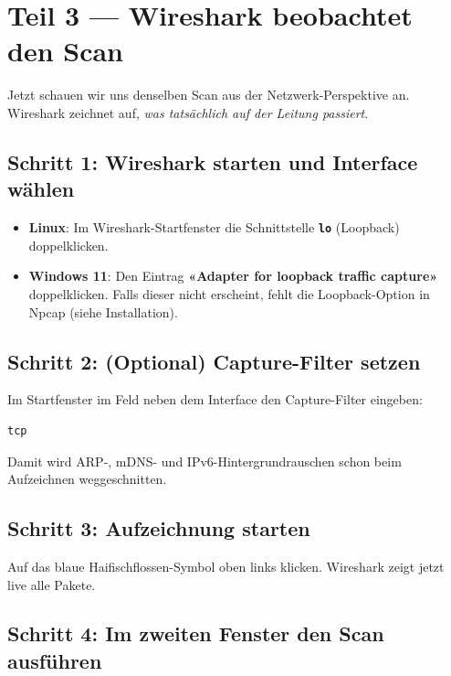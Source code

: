 \documentclass[
  nswissgerman,
  a4paper,
  DIV=11,
  numbers=noendperiod,
  ngerman]{scrreprt}
\providecommand{\tightlist}{%
  \setlength{\itemsep}{0pt}\setlength{\parskip}{0pt}}
\begin{document}
\section{Teil 3 --- Wireshark beobachtet den
Scan}\label{teil-3-wireshark-beobachtet-den-scan}

Jetzt schauen wir uns denselben Scan aus der Netzwerk-Perspektive an.
Wireshark zeichnet auf, \emph{was tatsächlich auf der Leitung passiert}.

\subsection{Schritt 1: Wireshark starten und Interface
wählen}\label{schritt-1-wireshark-starten-und-interface-wuxe4hlen}

\begin{itemize}
\tightlist
\item
  \textbf{Linux}: Im Wireshark-Startfenster die Schnittstelle
  \textbf{\texttt{lo}} (Loopback) doppelklicken.
\item
  \textbf{Windows 11}: Den Eintrag \textbf{«Adapter for loopback traffic
  capture»} doppelklicken. Falls dieser nicht erscheint, fehlt die
  Loopback-Option in Npcap (siehe Installation).
\end{itemize}

\subsection{Schritt 2: (Optional) Capture-Filter
setzen}\label{schritt-2-optional-capture-filter-setzen}

Im Startfenster im Feld neben dem Interface den Capture-Filter eingeben:

\begin{verbatim}
tcp
\end{verbatim}

Damit wird ARP-, mDNS- und IPv6-Hintergrundrauschen schon beim
Aufzeichnen weggeschnitten.

\subsection{Schritt 3: Aufzeichnung
starten}\label{schritt-3-aufzeichnung-starten}

Auf das blaue Haifischflossen-Symbol oben links klicken. Wireshark zeigt
jetzt live alle Pakete.

\subsection{Schritt 4: Im zweiten Fenster den Scan
ausführen}\label{schritt-4-im-zweiten-fenster-den-scan-ausfuxfchren}
\end{document}
